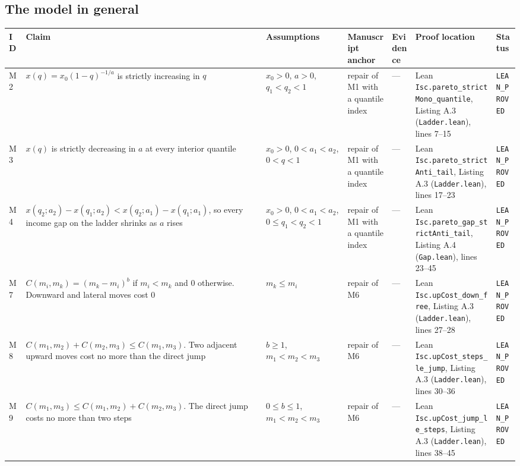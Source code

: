 \documentclass[10pt]{article}
\begin{document}
{\small
\subsection*{The model in general}
\begin{longtable}{>{\raggedright\arraybackslash}p{0.8cm} >{\raggedright\arraybackslash}p{5.0cm} >{\raggedright\arraybackslash}p{2.9cm} >{\raggedright\arraybackslash}p{3.9cm} >{\raggedright\arraybackslash}p{4.4cm} >{\raggedright\arraybackslash}p{3.6cm} >{\raggedright\arraybackslash}p{2.5cm}}
\toprule ID & Claim & Assumptions & Manuscript anchor & Evidence & Proof location & Status \\ \midrule \endhead
M2 & $x(q)=x_0(1-q)^{-1/a}$ is strictly increasing in $q$ & $x_0>0$, $a>0$, $q_1<q_2<1$ & repair of M1 with a quantile index & --- & Lean \nolinkurl{Isc.pareto_strictMono_quantile}, Listing A.3 (\nolinkurl{Ladder.lean}), lines 7--15 & \texttt{LEAN\_PROVED} \\ \midrule
M3 & $x(q)$ is strictly decreasing in $a$ at every interior quantile & $x_0>0$, $0<a_1<a_2$, $0<q<1$ & repair of M1 with a quantile index & --- & Lean \nolinkurl{Isc.pareto_strictAnti_tail}, Listing A.3 (\nolinkurl{Ladder.lean}), lines 17--23 & \texttt{LEAN\_PROVED} \\ \midrule
M4 & $x(q_2;a_2)-x(q_1;a_2) < x(q_2;a_1)-x(q_1;a_1)$, so every income gap on the ladder shrinks as $a$ rises & $x_0>0$, $0<a_1<a_2$, $0\le q_1<q_2<1$ & repair of M1 with a quantile index & --- & Lean \nolinkurl{Isc.pareto_gap_strictAnti_tail}, Listing A.4 (\nolinkurl{Gap.lean}), lines 23--45 & \texttt{LEAN\_PROVED} \\ \midrule
M7 & $C(m_i,m_k)=(m_k-m_i)^b$ if $m_i<m_k$ and $0$ otherwise. Downward and lateral moves cost $0$ & $m_k\le m_i$ & repair of M6 & --- & Lean \nolinkurl{Isc.upCost_down_free}, Listing A.3 (\nolinkurl{Ladder.lean}), lines 27--28 & \texttt{LEAN\_PROVED} \\ \midrule
M8 & $C(m_1,m_2)+C(m_2,m_3)\le C(m_1,m_3)$. Two adjacent upward moves cost no more than the direct jump & $b\ge 1$, $m_1<m_2<m_3$ & repair of M6 & --- & Lean \nolinkurl{Isc.upCost_steps_le_jump}, Listing A.3 (\nolinkurl{Ladder.lean}), lines 30--36 & \texttt{LEAN\_PROVED} \\ \midrule
M9 & $C(m_1,m_3)\le C(m_1,m_2)+C(m_2,m_3)$. The direct jump costs no more than two steps & $0\le b\le 1$, $m_1<m_2<m_3$ & repair of M6 & --- & Lean \nolinkurl{Isc.upCost_jump_le_steps}, Listing A.3 (\nolinkurl{Ladder.lean}), lines 38--45 & \texttt{LEAN\_PROVED} \\ \midrule

\end{longtable}}
\end{document}
